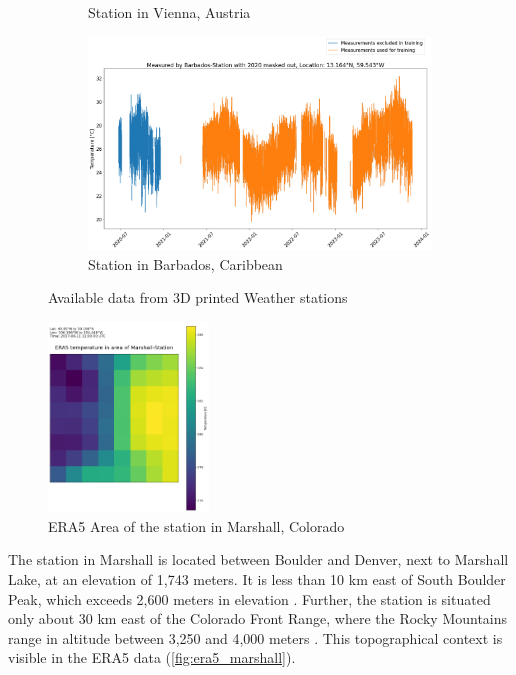 \begin{figure}
\begin{subfigure}{0.672\textwidth}
\caption{Station in Vienna, Austria}
\label{fig:available_measurements_vienna}
\end{subfigure}
\begin{subfigure}{0.672\textwidth}
\includegraphics[width=\textwidth]{resources/images/charts/barbados_available_measurements.png}
\caption{Station in Barbados, Caribbean}
\label{fig:available_measurements_barbados}
\end{subfigure}
\caption{Available data from 3D printed Weather stations}
\label{fig:weather_stations}
\end{figure}

\begin{figure}
\centering
\includegraphics[width=0.38\textwidth]{resources/images/Marshall_era5.png}
\caption{ERA5 Area of the station in Marshall, Colorado}
\label{fig:era5_marshall}
\end{figure}

The station in Marshall is located between Boulder and Denver, next to Marshall Lake, at an elevation of 1,743 meters. It is less than 10 km east of South Boulder Peak, which exceeds 2,600 meters in elevation \cite{southboulderpeak}.
Further, the station is situated only about 30 km east of the Colorado Front Range, where the Rocky Mountains range in altitude between 3,250 and 4,000 meters \cite{Williams1996}.
This topographical context is visible in the ERA5 data (\autoref{fig:era5_marshall}).

